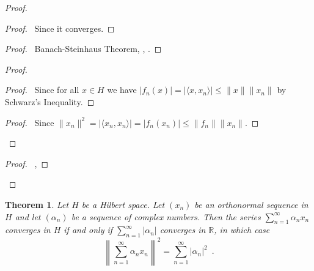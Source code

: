 \documentclass{book}
\let\qed\relax
\newtheorem{thm}[ax]{Theorem}
\theoremstyle{definition}
\begin{document}
\begin{proof}
\pf
{}
\begin{proof}
	\pf\ Since it converges.
\end{proof}
\begin{proof}
	\pf\ Banach-Steinhaus Theorem, , .
\end{proof}
\begin{proof}
	\begin{proof}
		\pf\ Since for all $x \in H$ we have $|f_n(x)| = |\langle x,x_n\rangle| \leq \|x\|\|x_n\|$ by Schwarz's Inequality.
	\end{proof}
	\begin{proof}
		\pf\ Since $\|x_n\|^2 = |\langle x_n, x_n\rangle| = |f_n(x_n)| \leq \|f_n\| \|x_n\|$.
	\end{proof}
\end{proof}
\begin{proof}
	\pf\ , 
\end{proof}
\qed
\end{proof}

\begin{thm}
\label{thm:infinite_Pythagoras}
Let $H$ be a Hilbert space. Let $(x_n)$ be an orthonormal sequence in $H$ and let $(\alpha_n)$ be a sequence of complex numbers. Then the series $\sum_{n=1}^\infty \alpha_n x_n$ converges in $H$ if and only if $\sum_{n=1}^\infty |\alpha_n|$ converges  in $\mathbb{R}$, in which case
\[ \left\| \sum_{n=1}^\infty \alpha_n x_n \right\|^2 = \sum_{n=1}^\infty |\alpha_n|^2 \enspace . \]
\end{thm}
\end{document}
